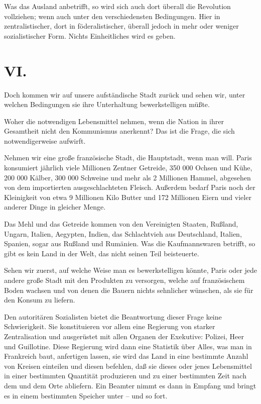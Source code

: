 \documentclass{scrbook}
\begin{document}
Was das Ausland anbetrifft, so wird sich auch dort überall die Revolution vollziehen; wenn auch unter den verschiedensten Bedingungen. Hier in zentralistischer, dort in föderalistischer, überall jedoch in mehr oder weniger sozialistischer Form. Nichts Einheitliches wird es geben.

\section*{VI.}

Doch kommen wir auf unsere aufständische Stadt zurück und sehen wir, unter welchen Bedingungen sie ihre Unterhaltung bewerkstelligen müßte.

Woher die notwendigen Lebensmittel nehmen, wenn die Nation in ihrer Gesamtheit nicht den Kommunismus anerkennt? Das ist die Frage, die sich notwendigerweise aufwirft.

Nehmen wir eine große französische Stadt, die Hauptstadt, wenn man will. Paris konsumiert jährlich viele Millionen Zentner Getreide, 350 000 Ochsen und Kühe, 200 000 Kälber, 300 000 Schweine und mehr als 2 Millionen Hammel, abgesehen von dem importierten ausgeschlachteten Fleisch. Außerdem bedarf Paris noch der Kleinigkeit von etwa 9 Millionen Kilo Butter und 172 Millionen Eiern und vieler anderer Dinge in gleicher Menge.

Das Mehl und das Getreide kommen von den Vereinigten Staaten, Rußland, Ungarn, Italien, Aegypten, Indien, das Schlachtvieh aus Deutschland, Italien, Spanien, sogar aus Rußland und Rumänien. Was die Kaufmannswaren betrifft, so gibt es kein Land in der Welt, das nicht seinen Teil beisteuerte.

Sehen wir zuerst, auf welche Weise man es bewerkstelligen könnte, Paris oder jede andere große Stadt mit den Produkten zu versorgen, welche auf französischem Boden wachsen und von denen die Bauern nichts sehnlicher wünschen, als sie für den Konsum zu liefern.

Den autoritären Sozialisten bietet die Beantwortung dieser Frage keine Schwierigkeit. Sie konstituieren vor allem eine Regierung von starker Zentralisation und ausgerüstet mit allen Organen der Exekutive: Polizei, Heer und Guillotine. Diese Regierung wird dann eine Statistik über Alles, was man in Frankreich baut, anfertigen lassen, sie wird das Land in eine bestimmte Anzahl von Kreisen einteilen und diesen befehlen, daß sie dieses oder jenes Lebensmittel in einer bestimmten Quantität produzieren und zu einer bestimmten Zeit nach dem und dem Orte abliefern. Ein Beamter nimmt es dann in Empfang und bringt es in einem bestimmten Speicher unter – und so fort.
\end{document}
